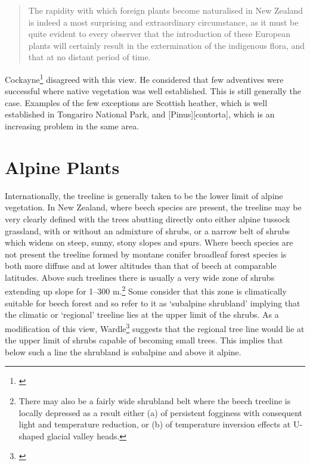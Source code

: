 \begin{quote}
	The rapidity with which foreign plants become naturalised in New Zealand is indeed a most surprising and extraordinary circumstance, as it must be quite evident to every observer that the introduction of these European plants will certainly result in the extermination of the indigenous flora, and that at no distant period of time.
\end{quote}

Cockayne\footnote{\cite{cockayne1967plants}} disagreed with this view.
He considered that few adventives were successful where native vegetation was well established.
This is still generally the case.
Examples of the few exceptions are Scottish heather, which is well established in Tongariro National Park, and [Pinus][contorta], which is an increasing problem in the same area.

\chapter{Alpine Plants}

Internationally, the treeline is generally taken to be the lower limit of alpine vegetation.
In New Zealand, where beech species are present, the treeline may be very clearly defined with the trees abutting directly onto either alpine tussock grassland, with or without an admixture of shrubs, or a narrow belt of shrubs which widens on steep, sunny, stony slopes and spurs.
Where beech species are not present the treeline formed by montane conifer broadleaf forest species is both more diffuse and at lower altitudes than that of beech at comparable latitudes.
Above such treelines there is usually a very wide zone of shrubs extending up slope for 1--300 m.\footnote{There may also be a fairly wide shrubland belt where the beech treeline is locally depressed as a result either (a) of persistent fogginess with consequent light and temperature reduction, or (b) of temperature inversion effects at U-shaped glacial valley heads.}
Some consider that this zone is climatically suitable for beech forest and so refer to it as `subalpine shrubland' implying that the climatic or `regional' treeline lies at the upper limit of the shrubs.
As a modification of this view, Wardle\footnote{\cite{wardle1965comparison}} suggests that the regional tree line would lie at the upper limit of shrubs capable of becoming small trees.
This implies that below such a line the shrubland is subalpine and above it alpine.

